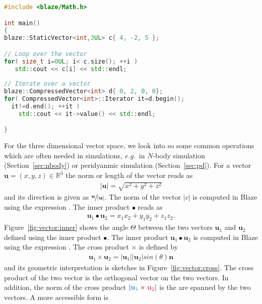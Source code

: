 \begin{lstlisting}[language=c++,caption={Iterating over a Blaze vector using a for loop with iterators.\label{code:blaze:vector:iterator}},float,floatplacement=tb]
#include <blaze/Math.h>

int main()
{
blaze::StaticVector<int,3UL> c{ 4, -2, 5 };

// Loop over the vector
for( size_t i=0UL; i< c.size(); ++i )
   std::cout << c[i] << std::endl;
   
// Iterate over a vector
blaze::CompressedVector<int> d{ 0, 2, 0, 0};
for( CompressedVector<int>::Iterator it=d.begin(); 
  it!=d.end(); ++it ) 
    std::cout << it->value() << std::endl;

}
\end{lstlisting}

For the three dimensional vector space, we look into so some common operations which are often needed in simulations, \emph{e.g.}\ in $N$-body simulation (Section~\ref{sec:nbody}) or peridyanmic simulation (Section~\ref{sec:pd}). For a vector $\mathbf{u}=(x,y,z)\in\mathbb{R}^3$ the norm or length of the vector reads as
\begin{align}
\vert\mathbf{u}\vert = \sqrt{x^2+y^2+z^2}
\end{align}
and its direction is given as $\sfrac{\mathbf{u}}{\vert\mathbf{u}\vert}$. The norm of the vector $\vert c \vert$ is computed in Blaze using the expression . The inner product $\bullet$ reads as
\begin{align}
\mathbf{u}_1 \bullet \mathbf{u}_2 = x_1x_2 + y_1y_2 + z_1z_2\text{.}
\end{align}
Figure~\ref{fig:vector:inner} shows the angle $\Theta$ between the two vectors $\mathbf{u}_1$ and $\mathbf{u}_2$ defined using the inner product $\bullet$.  The inner product $\mathbf{u}_1 \bullet \mathbf{u}_2 $ is computed in Blaze using the expression . The cross product $\times$ is defined by
\begin{align}
\mathbf{u}_1 \times \mathbf{u}_2 = \vert\mathbf{u}_1 \vert \vert\mathbf{u}_2 \vert sin(\theta) \mathbf{n}
\end{align}
and its geometric interpretation is sketches in Figure~\ref{fig:vector:cross}. The cross product of the two vector is the orthogonal vector on the two vectors. In addition, the norm of the cross product $\vert\textcolor{azure}{\mathbf{u}_1}\times\textcolor{amaranth}{\mathbf{u}_2}\vert$ is the are spanned by the two vectors. A more accessible form is
